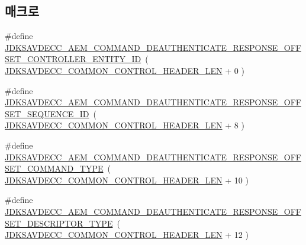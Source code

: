 \subsection*{매크로}
\begin{DoxyCompactItemize}
\item 
\#define \hyperlink{group__command__deauthenticate__response_gaf791b1b27501b3c78e5e477648b04980}{J\+D\+K\+S\+A\+V\+D\+E\+C\+C\+\_\+\+A\+E\+M\+\_\+\+C\+O\+M\+M\+A\+N\+D\+\_\+\+D\+E\+A\+U\+T\+H\+E\+N\+T\+I\+C\+A\+T\+E\+\_\+\+R\+E\+S\+P\+O\+N\+S\+E\+\_\+\+O\+F\+F\+S\+E\+T\+\_\+\+C\+O\+N\+T\+R\+O\+L\+L\+E\+R\+\_\+\+E\+N\+T\+I\+T\+Y\+\_\+\+ID}~( \hyperlink{group__jdksavdecc__avtp__common__control__header_gaae84052886fb1bb42f3bc5f85b741dff}{J\+D\+K\+S\+A\+V\+D\+E\+C\+C\+\_\+\+C\+O\+M\+M\+O\+N\+\_\+\+C\+O\+N\+T\+R\+O\+L\+\_\+\+H\+E\+A\+D\+E\+R\+\_\+\+L\+EN} + 0 )
\item 
\#define \hyperlink{group__command__deauthenticate__response_ga77e9e77f621e6b21318915a71838113f}{J\+D\+K\+S\+A\+V\+D\+E\+C\+C\+\_\+\+A\+E\+M\+\_\+\+C\+O\+M\+M\+A\+N\+D\+\_\+\+D\+E\+A\+U\+T\+H\+E\+N\+T\+I\+C\+A\+T\+E\+\_\+\+R\+E\+S\+P\+O\+N\+S\+E\+\_\+\+O\+F\+F\+S\+E\+T\+\_\+\+S\+E\+Q\+U\+E\+N\+C\+E\+\_\+\+ID}~( \hyperlink{group__jdksavdecc__avtp__common__control__header_gaae84052886fb1bb42f3bc5f85b741dff}{J\+D\+K\+S\+A\+V\+D\+E\+C\+C\+\_\+\+C\+O\+M\+M\+O\+N\+\_\+\+C\+O\+N\+T\+R\+O\+L\+\_\+\+H\+E\+A\+D\+E\+R\+\_\+\+L\+EN} + 8 )
\item 
\#define \hyperlink{group__command__deauthenticate__response_ga45d20a48fd5d1246756763999881b34b}{J\+D\+K\+S\+A\+V\+D\+E\+C\+C\+\_\+\+A\+E\+M\+\_\+\+C\+O\+M\+M\+A\+N\+D\+\_\+\+D\+E\+A\+U\+T\+H\+E\+N\+T\+I\+C\+A\+T\+E\+\_\+\+R\+E\+S\+P\+O\+N\+S\+E\+\_\+\+O\+F\+F\+S\+E\+T\+\_\+\+C\+O\+M\+M\+A\+N\+D\+\_\+\+T\+Y\+PE}~( \hyperlink{group__jdksavdecc__avtp__common__control__header_gaae84052886fb1bb42f3bc5f85b741dff}{J\+D\+K\+S\+A\+V\+D\+E\+C\+C\+\_\+\+C\+O\+M\+M\+O\+N\+\_\+\+C\+O\+N\+T\+R\+O\+L\+\_\+\+H\+E\+A\+D\+E\+R\+\_\+\+L\+EN} + 10 )
\item 
\#define \hyperlink{group__command__deauthenticate__response_ga216a1d0cd05e807384d5dcd4a6664e0d}{J\+D\+K\+S\+A\+V\+D\+E\+C\+C\+\_\+\+A\+E\+M\+\_\+\+C\+O\+M\+M\+A\+N\+D\+\_\+\+D\+E\+A\+U\+T\+H\+E\+N\+T\+I\+C\+A\+T\+E\+\_\+\+R\+E\+S\+P\+O\+N\+S\+E\+\_\+\+O\+F\+F\+S\+E\+T\+\_\+\+D\+E\+S\+C\+R\+I\+P\+T\+O\+R\+\_\+\+T\+Y\+PE}~( \hyperlink{group__jdksavdecc__avtp__common__control__header_gaae84052886fb1bb42f3bc5f85b741dff}{J\+D\+K\+S\+A\+V\+D\+E\+C\+C\+\_\+\+C\+O\+M\+M\+O\+N\+\_\+\+C\+O\+N\+T\+R\+O\+L\+\_\+\+H\+E\+A\+D\+E\+R\+\_\+\+L\+EN} + 12 )

\end{DoxyCompactItemize}

